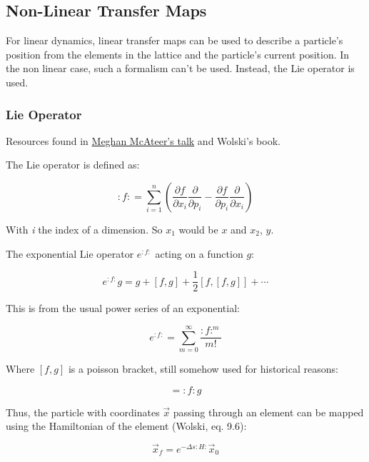 \documentclass[12pt,a4,]{article}
\numberwithin{equation}{subsection}
\begin{document}
\hypertarget{non-linear-transfer-maps}{%
\subsection{Non-Linear Transfer Maps}\label{non-linear-transfer-maps}}

For linear dynamics, linear transfer maps can be used to describe a
particle's position from the elements in the lattice and the particle's
current position. In the non linear case, such a formalism can't be
used. Instead, the Lie operator is used.

\hypertarget{lie-operator}{%
\subsubsection{Lie Operator}\label{lie-operator}}

Resources found in
\href{https://mlegarre.web.cern.ch/mlegarre/Courses/Meghan_RDTpresentation.pdf}{Meghan
McAteer's talk} and Wolski's book.

The Lie operator is defined as:

\[
\colon f \colon = \sum^n_{i=1} \left(\frac{\partial f}{\partial x_i} \frac{\partial}{\partial p_i} 
                           - \frac{\partial f}{\partial p_i} \frac{\partial}{\partial x_i}
                      \right)
\]

With \emph{i} the index of a dimension. So \(x_1\) would be \(x\) and
\(x_2\), \(y\).

The exponential Lie operator \(e^{:f:}\) acting on a function \(g\):

\begin{equation}e^{:f:}g = g + [f, g] + \frac{1}{2} [f, [f, g]] + \cdots\label{eq:Lie}\end{equation}

This is from the usual power series of an exponential:

\[e^{:f:} = \sum^{\infty}_{m=0} \frac{:f:^m}{m!}\]

Where \([f, g]\) is a poisson bracket, still somehow used for historical
reasons:

\begin{equation}[f, g] = \colon f \colon g
\label{eq:poisson_bracket}\end{equation}

Thus, the particle with coordinates \(\vec{x}\) passing through an
element can be mapped using the Hamiltonian of the element (Wolski, eq.
9.6):

\begin{equation}\vec{x}_f = e^{-\Delta s:H:} \vec{x}_0\label{eq:position_non_linear}\end{equation}
\end{document}
